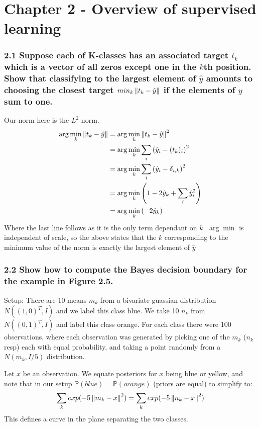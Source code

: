 
\chapter{Chapter 2 - Overview of supervised learning}






\subsection*{2.1 Suppose each of K-classes has an associated target $t_k$ which is a vector of all zeros except one in the $k$th position. Show that classifying to the largest element of $\hat{y}$ amounts to choosing the closest target $min_k \left\lVert t_k - \hat{y}\right\rVert$ if the elements of $y$ sum to one.}

Our norm here is the $L^2$ norm. 
\begin{align*}
    \arg\min_k \left\lVert t_k - \hat{y}\right\rVert &=  \arg\min_k \left\lVert t_k - \hat{y}\right\rVert^2 \\
    &= \arg\min_k \sum_i \left(\hat{y}_i - (t_k)_i\right)^2 \\
    &= \arg\min_k \sum_i \left(\hat{y}_i - \delta_{i, k}\right)^2 \\
    &= \arg\min_k \left( 1 - 2 \hat{y}_k + \sum_i  \hat{y}_i^2\right)  \\
    &= \arg\min_k \left(-2\hat{y}_k\right)
\end{align*}
Where the last line follows as it is the only term dependant on $k$. $\arg\min$ is independent of scale, so the above states that the $k$ corresponding to the minimum value of the norm is exactly the largest element of $\hat{y}$







\subsection*{2.2 Show how to compute the Bayes decision boundary for the example in Figure 2.5.}
Setup: There are 10 means $m_k$ from a bivariate guassian distribution $N((1,0)^T, I)$ and we label this class blue.
We take 10 $n_k$ from $N((0,1)^T, I)$ and label this class orange.
For each class there were 100 observations, where each observation was generated by picking one of the $m_k$ ($n_k$ resp) each with equal probability, and taking a point randomly from a $N(m_k, I/5)$ distribution.

Let $x$ be an observation. We equate posteriors for $x$ being blue or yellow, and note that in our setup $\mathbb{P}(blue) = \mathbb{P}(orange)$ (priors are equal) to simplify to:
$$\sum_k exp(-5 \left\lVert m_k - x\right\rVert^2) = \sum_k exp(-5 \left\lVert n_k - x\right\rVert^2)$$
This defines a curve in the plane separating the two classes.






